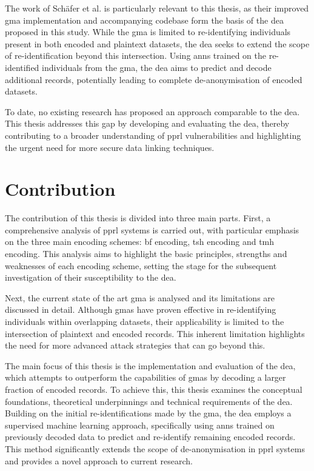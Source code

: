 The work of Schäfer et al. \cite{schaefer2024} is particularly relevant to this thesis, as their improved \ac{gma} implementation and accompanying codebase form the basis of the \ac{dea} proposed in this study.
While the \ac{gma} is limited to re-identifying individuals present in both encoded and plaintext datasets, the \ac{dea} seeks to extend the scope of re-identification beyond this intersection.
Using \ac{ann}s trained on the re-identified individuals from the \ac{gma}, the \ac{dea} aims to predict and decode additional records, potentially leading to complete de-anonymisation of encoded datasets.

To date, no existing research has proposed an approach comparable to the \ac{dea}.
This thesis addresses this gap by developing and evaluating the \ac{dea}, thereby contributing to a broader understanding of \ac{pprl} vulnerabilities and highlighting the urgent need for more secure data linking techniques.

\section{Contribution}  \label{sec:contribution}

The contribution of this thesis is divided into three main parts.
First, a comprehensive analysis of \ac{pprl} systems is carried out, with particular emphasis on the three main encoding schemes: \ac{bf} encoding, \ac{tsh} encoding and \ac{tmh} encoding.
This analysis aims to highlight the basic principles, strengths and weaknesses of each encoding scheme, setting the stage for the subsequent investigation of their susceptibility to the \ac{dea}.

Next, the current state of the art \ac{gma} is analysed and its limitations are discussed in detail.
Although \ac{gma}s have proven effective in re-identifying individuals within overlapping datasets, their applicability is limited to the intersection of plaintext and encoded records.
This inherent limitation highlights the need for more advanced attack strategies that can go beyond this.

The main focus of this thesis is the implementation and evaluation of the \ac{dea}, which attempts to outperform the capabilities of \ac{gma}s by decoding a larger fraction of encoded records.
To achieve this, this thesis examines the conceptual foundations, theoretical underpinnings and technical requirements of the \ac{dea}.
Building on the initial re-identifications made by the \ac{gma}, the \ac{dea} employs a supervised machine learning approach, specifically using \ac{ann}s trained on previously decoded data to predict and re-identify remaining encoded records.
This method significantly extends the scope of de-anonymisation in \ac{pprl} systems and provides a novel approach to current research.

